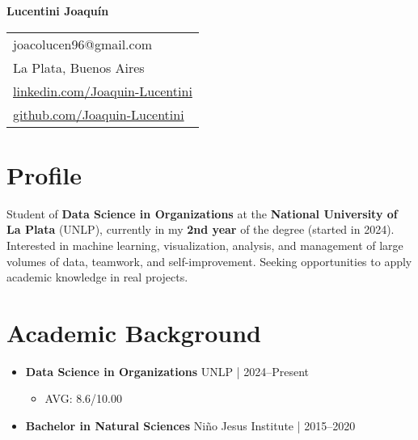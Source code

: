 \documentclass[11pt, a4paper]{article}
\newcommand{\cvitem}[2]{\textbf{#1} \hfill \color{secondary}#2} %
\begin{document}
\begin{center}
    {\Huge \textbf{Lucentini Joaquín}} \\[15pt]
    
    \noindent
    \begin{tabular}{@{} l @{}}
    \faEnvelope{} joacolucen96@gmail.com \\
    \faMapMarker{} La Plata, Buenos Aires \\
    \faLinkedin{} \href{https://www.linkedin.com/in/joaquin-lucentini-a48066277/}{linkedin.com/Joaquin-Lucentini} \\
    \faGithub{} \href{https://github.com/JoacoLucen}{github.com/Joaquin-Lucentini}
    \end{tabular}
\end{center}

\section*{Profile}
Student of \textbf{Data Science in Organizations} at the \textbf{National University of La Plata} (UNLP), currently in my \textbf{2nd year} of the degree (started in 2024). Interested in machine learning, visualization, analysis, and management of large volumes of data, teamwork, and self-improvement. Seeking opportunities to apply academic knowledge in real projects.

\section*{Academic Background}
\begin{itemize}[leftmargin=*]
    \item \cvitem{Data Science in Organizations}{UNLP | 2024--Present}
    \begin{itemize}
        \item AVG: 8.6/10.00
    \end{itemize}
    \item \cvitem{Bachelor in Natural Sciences}{Niño Jesus Institute | 2015--2020}
\end{itemize}

\end{document}
